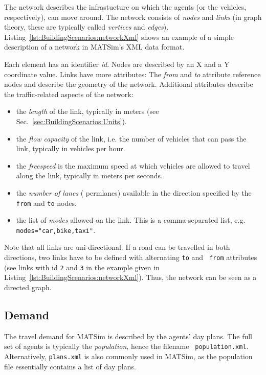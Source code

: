 The network describes the infrastucture on which the agents (or the vehicles,
respectively), can move around. The network consists of \emph{nodes} and
\emph{links} (in graph theory, these are typically called \emph{vertices} and
\emph{edges}). Listing~\ref{lst:BuildingScenarios:networkXml} shows an example
of a simple description of a network in MATSim's XML data format.

Each element has an identifier \emph{id}. Nodes are described by an X and a Y
coordinate value. Links have more attributes: The \emph{from} and \emph{to}
attribute reference nodes and describe the geometry of the network. Additional
attributes describe the traffic-related aspects of the network:
\begin{itemize}\styleItemize
  \item the \emph{length} of the link, typically in meters (see
  Sec.~\ref{sec:BuildingScenarios:Units}).
  \item the \emph{flow capacity} of the link, i.e. the number of vehicles that
  can pass the link, typically in vehicles per hour.
  \item the \emph{freespeed} is the maximum speed at which vehicles are allowed
  to travel along the link, typically in meters per seconds.
  \item the \emph{number of lanes} ({\tt} permlanes) available in the direction
  specified by the {\tt from} and {\tt to} nodes.
  \item the list of \emph{modes} allowed on the link. This is a comma-separated
  list, e.g. {\tt modes="car,bike,taxi"}.
\end{itemize}
Note that all links are uni-directional. If a road can be travelled in both
directions, two links have to be defined with alternating {\tt to} and {\tt
from} attributes (see links with id {\tt 2} and {\tt 3} in the example given in
Listing~\ref{lst:BuildingScenarios:networkXml}).
Thus, the network can be seen as a directed graph.


\subsection{Demand}

The travel demand for MATSim is described by the agents' day plans. The full set
of agents is typically the \emph{population}, hence the filename {\tt
population.xml}. Alternatively, {\tt plans.xml} is also commonly used in MATSim,
as the population file essentially contains a list of day plans.

